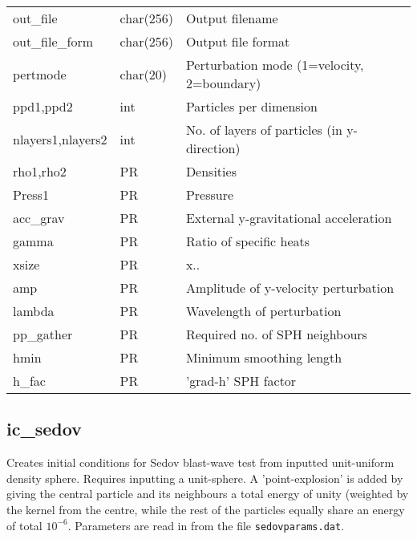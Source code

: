 \documentclass[a4paper]{article}
\newcommand{\var}[1]{\texttt{#1}}
\begin{document}
\begin{center}
\begin{supertabular}{|p{3cm}|p{2cm}|p{8cm}|}
out\_file         & char(256) & Output filename \\
out\_file\_form   & char(256) & Output file format \\
pertmode          & char(20)  & Perturbation mode (1=velocity, 2=boundary) \\
ppd1,ppd2         & int       & Particles per dimension \\
nlayers1,nlayers2 & int       & No. of layers of particles (in y-direction) \\
rho1,rho2         & PR        & Densities \\
Press1            & PR        & Pressure \\
acc\_grav         & PR        & External y-gravitational acceleration \\      
gamma             & PR        & Ratio of specific heats \\
xsize             & PR        & x.. \\
amp               & PR        & Amplitude of y-velocity perturbation \\
lambda            & PR        & Wavelength of perturbation \\
pp\_gather        & PR        & Required no. of SPH neighbours \\
hmin              & PR        & Minimum smoothing length \\
h\_fac            & PR        & 'grad-h' SPH factor \\
\end{supertabular}
\end{center}

\newpage

\subsection{ic\_sedov}
Creates initial conditions for Sedov blast-wave test from inputted unit-uniform density sphere.  Requires inputting a unit-sphere.  A 'point-explosion' is added by giving the central particle and its neighbours a total energy of unity (weighted by the kernel from the centre, while the rest of the particles equally share an energy of total $10^{-6}$.  Parameters are read in from the file \var{sedovparams.dat}. \newline
\end{document}
